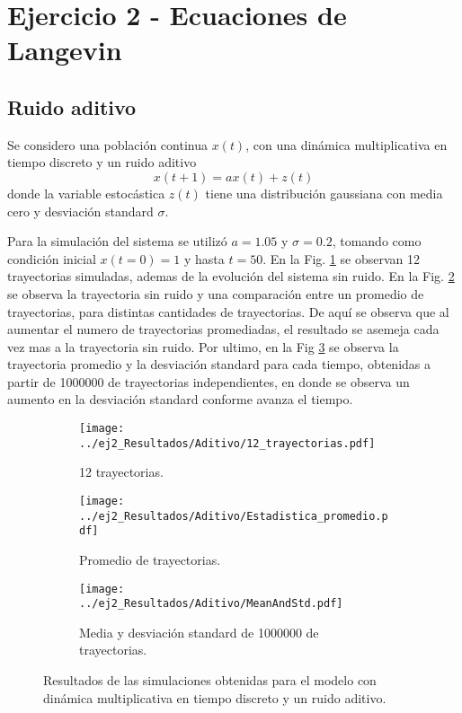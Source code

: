 \section*{Ejercicio 2 - Ecuaciones de Langevin}
\subsection*{Ruido aditivo}

Se considero una población continua $x\left(t\right)$, con una dinámica multiplicativa en tiempo discreto y un ruido aditivo
\begin{equation}
    x\left(t+1\right) = a x\left(t\right) + z\left(t\right)
\end{equation}
donde la variable estocástica $z\left(t\right)$ tiene una distribución gaussiana con media cero y desviación standard $\sigma$. 

Para la simulación del sistema se utilizó $a=1.05$ y $\sigma=0.2$, tomando como condición inicial $x\left(t=0\right) = 1$ y hasta $t=50$. En la Fig. \ref{ej2:12trayectorias} se observan 12 trayectorias simuladas, ademas de la evolución del sistema sin ruido. En la Fig. \ref{ej2:estadistica_promedio} se observa la trayectoria sin ruido y una comparación entre un promedio de trayectorias, para distintas cantidades de trayectorias. De aquí se observa que al aumentar el numero de trayectorias promediadas, el resultado se asemeja cada vez mas a la trayectoria sin ruido. Por ultimo, en la Fig \ref{ej2:mean_std} se observa la trayectoria promedio y la desviación standard para cada tiempo, obtenidas a partir de 1000000 de trayectorias independientes, en donde se observa un aumento en la desviación standard conforme avanza el tiempo.

\begin{figure}[htb!]
    \centering
    \begin{subfigure}[b]{0.47\textwidth}
        \texttt{[image: ../ej2\_Resultados/Aditivo/12\_trayectorias.pdf]}
        \caption{12 trayectorias.}
        \label{ej2:12trayectorias}
    \end{subfigure}
    \begin{subfigure}[b]{0.47\textwidth}
        \texttt{[image: ../ej2\_Resultados/Aditivo/Estadistica\_promedio.pdf]}
        \caption{Promedio de trayectorias.}
        \label{ej2:estadistica_promedio}
    \end{subfigure}
    \begin{subfigure}[b]{0.47\textwidth}
        \texttt{[image: ../ej2\_Resultados/Aditivo/MeanAndStd.pdf]}
        \caption{Media y desviación standard de 1000000 de trayectorias.}
        \label{ej2:mean_std}
    \end{subfigure}
    \caption{Resultados de las simulaciones obtenidas para el modelo con dinámica multiplicativa en tiempo discreto y un ruido aditivo.}
    \label{ej2:Resultados}
\end{figure}

